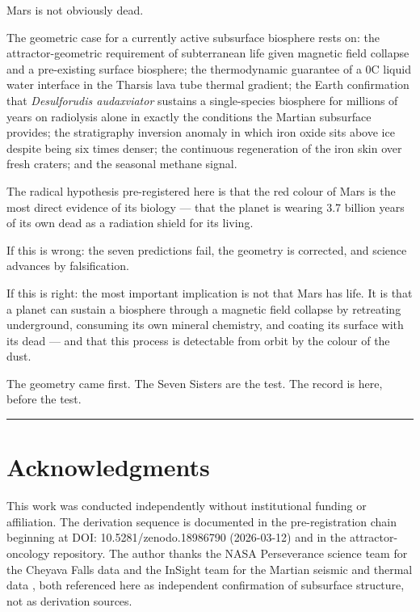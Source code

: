 \documentclass[11pt, a4paper]{article}
\begin{document}
Mars is not obviously dead.

The geometric case for a currently active
subsurface biosphere rests on:
the attractor-geometric requirement of
subterranean life given magnetic field
collapse and a pre-existing surface
biosphere;
the thermodynamic guarantee of a
0\textdegree{}C liquid water interface
in the Tharsis lava tube thermal gradient;
the Earth confirmation that
\textit{Desulforudis audaxviator} sustains
a single-species biosphere for millions
of years on radiolysis alone in exactly
the conditions the Martian subsurface
provides;
the stratigraphy inversion anomaly in
which iron oxide sits above ice despite
being six times denser;
the continuous regeneration of the iron
skin over fresh craters;
and the seasonal methane signal.

The radical hypothesis pre-registered here
is that the red colour of Mars is the
most direct evidence of its biology ---
that the planet is wearing 3.7 billion
years of its own dead as a radiation
shield for its living.

If this is wrong: the seven predictions
fail, the geometry is corrected, and
science advances by falsification.

If this is right: the most important
implication is not that Mars has life.
It is that a planet can sustain a
biosphere through a magnetic field
collapse by retreating underground,
consuming its own mineral chemistry,
and coating its surface with its dead ---
and that this process is detectable from
orbit by the colour of the dust.

The geometry came first.
The Seven Sisters are the test.
The record is here, before the test.

\vspace{1em}
\noindent\textcolor{rulecolor}{\rule{\linewidth}{0.4pt}}

\section*{Acknowledgments}

This work was conducted independently
without institutional funding or affiliation.
The derivation sequence is documented in
the pre-registration chain beginning at
DOI: 10.5281/zenodo.18986790 (2026-03-12)
and in the attractor-oncology repository.
The author thanks the NASA Perseverance
science team for the Cheyava Falls data
\cite{hurowitz2025} and the InSight team
for the Martian seismic and thermal data
\cite{insight2021}, both referenced here
as independent confirmation of subsurface
structure, not as derivation sources.
\end{document}
